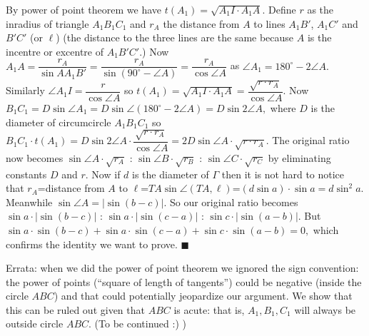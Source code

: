 \documentclass[11pt,a4paper]{article}
\begin{document}
\begin{enumerate}
	By power of point theorem we have $t(A_1)=\sqrt {A_1I\cdot A_1A}.$ Define $r$ as the inradius of triangle $A_1B_1C_1$ and $r_A$ the distance from $A$ to lines $A_1B'$, $A_1C'$ and $B'C'$ (or $\ell$) (the distance to the three lines are the same because $A$ is the incentre or excentre of $A_1B'C'$.) Now $A_1A=\dfrac{r_A}{\sin AA_1B'}=\dfrac{r_A}{\sin (90^{\circ}-\angle A)}=\dfrac{r_A}{\cos \angle A}$ as $\angle A_1=180^{\circ}-2\angle A.$ Similarly $\angle A_1I=\dfrac{r}{\cos \angle A}$ so $t(A_1)=\sqrt {A_1I\cdot A_1A}=\dfrac{\sqrt{r\cdot r_A}}{\cos \angle A}$. Now $B_1C_1=D\sin\angle A_1=D\sin\angle (180^{\circ}-2\angle A)=D\sin 2\angle A,$ where $D$ is the diameter of circumcircle $A_1B_1C_1$ so $B_1C_1\cdot t(A_1)=D\sin 2\angle A\cdot \dfrac{\sqrt{r\cdot r_A}}{\cos \angle A}=2D\sin \angle A\cdot\sqrt{r\cdot r_A}.$ The original ratio now becomes $\sin \angle A\cdot\sqrt{r_A}$ : $\sin \angle B\cdot\sqrt{r_B}$ : $\sin \angle C\cdot\sqrt{r_C}$ by eliminating constants $D$ and $r$. Now if $d$ is the diameter of $\Gamma$ then it is not hard to notice that $r_A$=distance from $A$ to $\ell$=$TA\sin\angle (TA,\ell)$=$(d\sin a)\cdot\sin a=d\sin^{2} a.$ Meanwhile $\sin\angle A=|\sin (b-c)|.$ So our original ratio becomes $\sin a\cdot|\sin (b-c)|$ : $\sin a\cdot|\sin (c-a)|$ : $\sin c\cdot|\sin (a-b)|$. But $\sin a\cdot\sin (b-c)+\sin a\cdot\sin (c-a)+\sin c\cdot\sin (a-b)=0,$ which confirms the identity we want to prove. $\blacksquare$
	
	Errata: when we did the power of point theorem we ignored the sign convention: the power of points (``square of length of tangents'') could be negative (inside the circle $ABC$) and that could potentially jeopardize our argument. We show that this can be ruled out given that $ABC$ is acute: that is, $A_1, B_1, C_1$ will always be outside circle $ABC$. (To be continued :) )
	
\end{enumerate}
\end{document}
